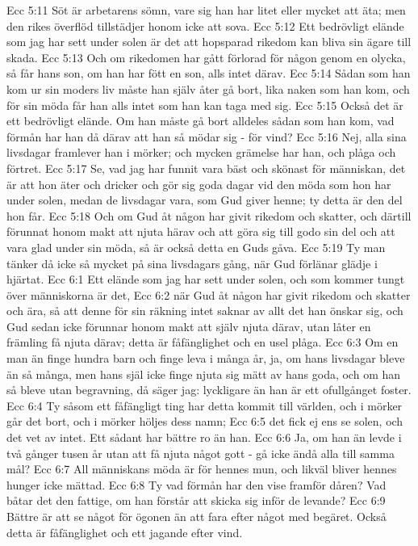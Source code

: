 Ecc 5:11  Söt är arbetarens sömn, vare sig han har litet eller mycket att äta; men den rikes överflöd tillstädjer honom icke att sova.
Ecc 5:12  Ett bedrövligt elände som jag har sett under solen är det att hopsparad rikedom kan bliva sin ägare till skada.
Ecc 5:13  Och om rikedomen har gått förlorad för någon genom en olycka, så får hans son, om han har fött en son, alls intet därav.
Ecc 5:14  Sådan som han kom ur sin moders liv måste han själv åter gå bort, lika naken som han kom, och för sin möda får han alls intet som han kan taga med sig.
Ecc 5:15  Också det är ett bedrövligt elände. Om han måste gå bort alldeles sådan som han kom, vad förmån har han då därav att han så mödar sig - för vind?
Ecc 5:16  Nej, alla sina livsdagar framlever han i mörker; och mycken grämelse har han, och plåga och förtret.
Ecc 5:17  Se, vad jag har funnit vara bäst och skönast för människan, det är att hon äter och dricker och gör sig goda dagar vid den möda som hon har under solen, medan de livsdagar vara, som Gud giver henne; ty detta är den del hon får.
Ecc 5:18  Och om Gud åt någon har givit rikedom och skatter, och därtill förunnat honom makt att njuta härav och att göra sig till godo sin del och att vara glad under sin möda, så är också detta en Guds gåva.
Ecc 5:19  Ty man tänker då icke så mycket på sina livsdagars gång, när Gud förlänar glädje i hjärtat.
Ecc 6:1  Ett elände som jag har sett under solen, och som kommer tungt över människorna är det,
Ecc 6:2  när Gud åt någon har givit rikedom och skatter och ära, så att denne för sin räkning intet saknar av allt det han önskar sig, och Gud sedan icke förunnar honom makt att själv njuta därav, utan låter en främling få njuta därav; detta är fåfänglighet och en usel plåga.
Ecc 6:3  Om en man än finge hundra barn och finge leva i många år, ja, om hans livsdagar bleve än så många, men hans själ icke finge njuta sig mätt av hans goda, och om han så bleve utan begravning, då säger jag: lyckligare än han är ett ofullgånget foster.
Ecc 6:4  Ty såsom ett fåfängligt ting har detta kommit till världen, och i mörker går det bort, och i mörker höljes dess namn;
Ecc 6:5  det fick ej ens se solen, och det vet av intet. Ett sådant har bättre ro än han.
Ecc 6:6  Ja, om han än levde i två gånger tusen år utan att få njuta något gott - gå icke ändå alla till samma mål?
Ecc 6:7  All människans möda är för hennes mun, och likväl bliver hennes hunger icke mättad.
Ecc 6:8  Ty vad förmån har den vise framför dåren? Vad båtar det den fattige, om han förstår att skicka sig inför de levande?
Ecc 6:9  Bättre är att se något för ögonen än att fara efter något med begäret. Också detta är fåfänglighet och ett jagande efter vind.
